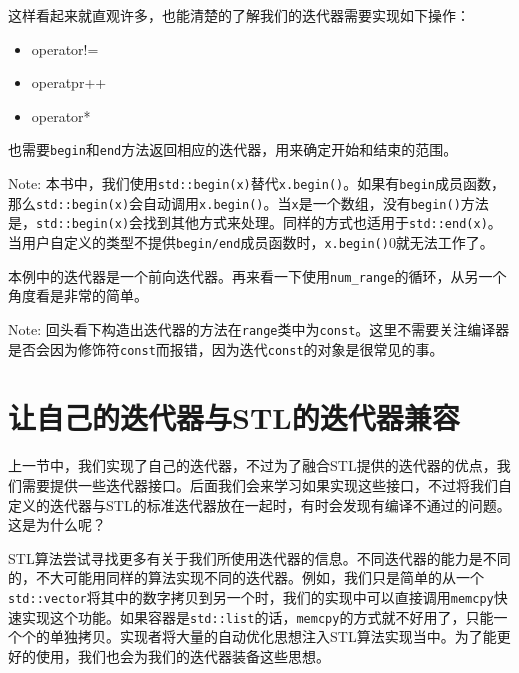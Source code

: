 这样看起来就直观许多，也能清楚的了解我们的迭代器需要实现如下操作：

\begin{itemize}
\item operator!=

\item operatpr++

\item operator*

\end{itemize}

也需要\texttt{begin}和\texttt{end}方法返回相应的迭代器，用来确定开始和结束的范围。

\begin{myInfoBox}
Note: 本书中，我们使用\texttt{std::begin(x)}替代\texttt{x.begin()}。如果有\texttt{begin}成员函数，那么\texttt{std::begin(x)}会自动调用\texttt{x.begin()}。当\texttt{x}是一个数组，没有\texttt{begin()}方法是，\texttt{std::begin(x)}会找到其他方式来处理。同样的方式也适用于\texttt{std::end(x)}。当用户自定义的类型不提供\texttt{begin/end}成员函数时，\texttt{x.begin()}0就无法工作了。
\end{myInfoBox}

本例中的迭代器是一个前向迭代器。再来看一下使用\texttt{num\_range}的循环，从另一个角度看是非常的简单。

\begin{myInfoBox}
Note: 回头看下构造出迭代器的方法在\texttt{range}类中为\texttt{const}。这里不需要关注编译器是否会因为修饰符\texttt{const}而报错，因为迭代\texttt{const}的对象是很常见的事。
\end{myInfoBox}


\section{让自己的迭代器与STL的迭代器兼容}

上一节中，我们实现了自己的迭代器，不过为了融合STL提供的迭代器的优点，我们需要提供一些迭代器接口。后面我们会来学习如果实现这些接口，不过将我们自定义的迭代器与STL的标准迭代器放在一起时，有时会发现有编译不通过的问题。这是为什么呢？

STL算法尝试寻找更多有关于我们所使用迭代器的信息。不同迭代器的能力是不同的，不大可能用同样的算法实现不同的迭代器。例如，我们只是简单的从一个\texttt{std::vector}将其中的数字拷贝到另一个时，我们的实现中可以直接调用\texttt{memcpy}快速实现这个功能。如果容器是\texttt{std::list}的话，\texttt{memcpy}的方式就不好用了，只能一个个的单独拷贝。实现者将大量的自动优化思想注入STL算法实现当中。为了能更好的使用，我们也会为我们的迭代器装备这些思想。

